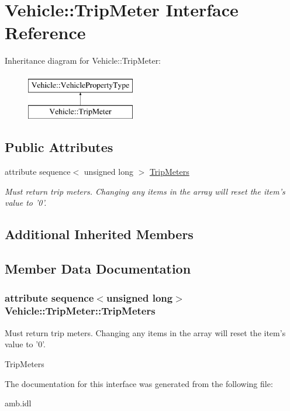 \hypertarget{interfaceVehicle_1_1TripMeter}{\section{Vehicle\-:\-:Trip\-Meter Interface Reference}
\label{interfaceVehicle_1_1TripMeter}
}
Inheritance diagram for Vehicle\-:\-:Trip\-Meter\-:\begin{figure}[H]
\begin{center}
\leavevmode
\includegraphics[height=2.000000cm]{interfaceVehicle_1_1TripMeter}
\end{center}
\end{figure}
\subsection*{Public Attributes}
\begin{DoxyCompactItemize}
\item 
attribute sequence$<$ unsigned long $>$ \hyperlink{interfaceVehicle_1_1TripMeter_ab7138bab22f0525784bda523fe0e09fa}{Trip\-Meters}
\begin{DoxyCompactList}\small\item\em Must return trip meters. Changing any items in the array will reset the item's value to '0'. \end{DoxyCompactList}\end{DoxyCompactItemize}
\subsection*{Additional Inherited Members}


\subsection{Member Data Documentation}
\hypertarget{interfaceVehicle_1_1TripMeter_ab7138bab22f0525784bda523fe0e09fa}{
\subsubsection[{Trip\-Meters}]{\setlength{\rightskip}{0pt plus 5cm}attribute sequence$<$unsigned long$>$ Vehicle\-::\-Trip\-Meter\-::\-Trip\-Meters}}\label{interfaceVehicle_1_1TripMeter_ab7138bab22f0525784bda523fe0e09fa}


Must return trip meters. Changing any items in the array will reset the item's value to '0'. 

Trip\-Meters 

The documentation for this interface was generated from the following file\-:\begin{DoxyCompactItemize}
\item 
amb.\-idl\end{DoxyCompactItemize}
